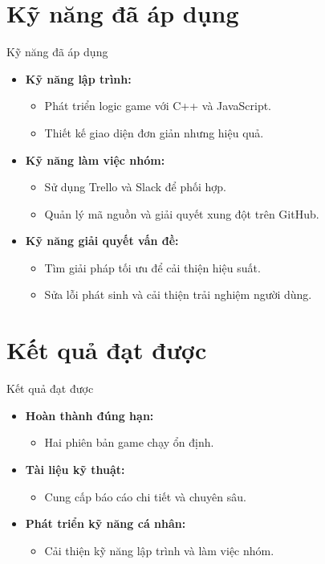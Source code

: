 \documentclass{beamer}
\begin{document}
\section{Kỹ năng đã áp dụng}
\begin{frame}{Kỹ năng đã áp dụng}
    \begin{itemize}
        \item \textbf{Kỹ năng lập trình:}
        \begin{itemize}
            \item Phát triển logic game với C++ và JavaScript.
            \item Thiết kế giao diện đơn giản nhưng hiệu quả.
        \end{itemize}
        \item \textbf{Kỹ năng làm việc nhóm:}
        \begin{itemize}
            \item Sử dụng Trello và Slack để phối hợp.
            \item Quản lý mã nguồn và giải quyết xung đột trên GitHub.
        \end{itemize}
        \item \textbf{Kỹ năng giải quyết vấn đề:}
        \begin{itemize}
            \item Tìm giải pháp tối ưu để cải thiện hiệu suất.
            \item Sửa lỗi phát sinh và cải thiện trải nghiệm người dùng.
        \end{itemize}
    \end{itemize}
\end{frame}

\section{Kết quả đạt được}
\begin{frame}{Kết quả đạt được}
    \begin{itemize}
        \item \textbf{Hoàn thành đúng hạn:}
        \begin{itemize}
            \item Hai phiên bản game chạy ổn định.
        \end{itemize}
        \item \textbf{Tài liệu kỹ thuật:}
        \begin{itemize}
            \item Cung cấp báo cáo chi tiết và chuyên sâu.
        \end{itemize}
        \item \textbf{Phát triển kỹ năng cá nhân:}
        \begin{itemize}
            \item Cải thiện kỹ năng lập trình và làm việc nhóm.
        \end{itemize}
    \end{itemize}
\end{frame}
\end{document}
